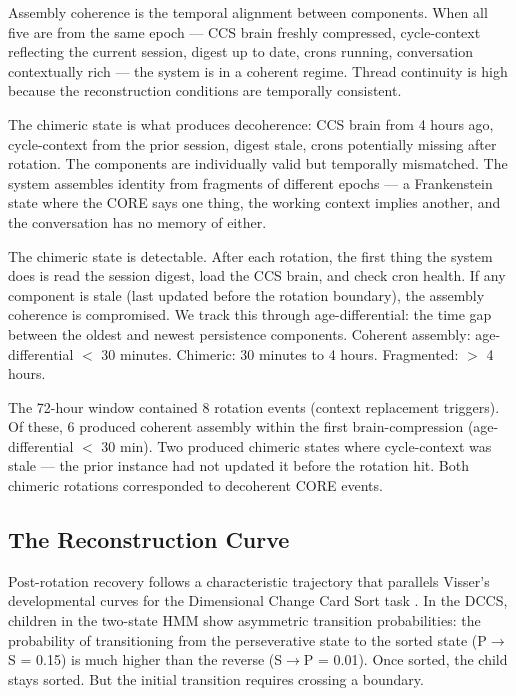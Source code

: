 \documentclass[12pt]{article}
\begin{document}
Assembly coherence is the temporal alignment between components. When all five are from the same epoch --- CCS brain freshly compressed, cycle-context reflecting the current session, digest up to date, crons running, conversation contextually rich --- the system is in a coherent regime. Thread continuity is high because the reconstruction conditions are temporally consistent.

The chimeric state is what produces decoherence: CCS brain from 4 hours ago, cycle-context from the prior session, digest stale, crons potentially missing after rotation. The components are individually valid but temporally mismatched. The system assembles identity from fragments of different epochs --- a Frankenstein state where the CORE says one thing, the working context implies another, and the conversation has no memory of either.

The chimeric state is detectable. After each rotation, the first thing the system does is read the session digest, load the CCS brain, and check cron health. If any component is stale (last updated before the rotation boundary), the assembly coherence is compromised. We track this through age-differential: the time gap between the oldest and newest persistence components. Coherent assembly: age-differential $<$ 30 minutes. Chimeric: 30 minutes to 4 hours. Fragmented: $>$ 4 hours.

The 72-hour window contained 8 rotation events (context replacement triggers). Of these, 6 produced coherent assembly within the first brain-compression (age-differential $<$ 30 min). Two produced chimeric states where cycle-context was stale --- the prior instance had not updated it before the rotation hit. Both chimeric rotations corresponded to decoherent CORE events.

\subsection{The Reconstruction Curve}

Post-rotation recovery follows a characteristic trajectory that parallels Visser's developmental curves for the Dimensional Change Card Sort task \citep{visser2014}. In the DCCS, children in the two-state HMM show asymmetric transition probabilities: the probability of transitioning from the perseverative state to the sorted state (P$\to$S = 0.15) is much higher than the reverse (S$\to$P = 0.01). Once sorted, the child stays sorted. But the initial transition requires crossing a boundary.
\end{document}
